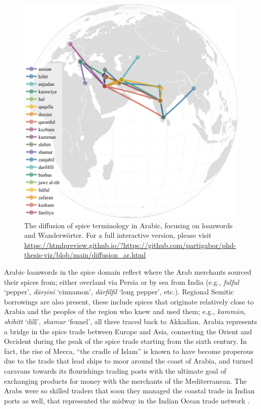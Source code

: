 \begin{figure}[ht!]
    \includegraphics[width=\linewidth]{imgs/plots/diffusion_ar.pdf}
    \caption[The diffusion of spice terminology in Arabic.]{The diffusion of spice terminology in Arabic, focusing on loanwords and Wanderwörter. For a full interactive version, please visit \url{https://htmlpreview.github.io/?https://github.com/partigabor/phd-thesis-viz/blob/main/diffusion_ar.html}}
    \label{fig:diffusion_ar}
\end{figure}

Arabic loanwords in the spice domain reflect where the Arab merchants sourced their spices from; either overland via Persia or by sea from India (e.g., \textit{fulful} `pepper', \textit{dārṣīnī} `cinnamon', \textit{dārfilfil} `long pepper', etc.). Regional Semitic borrowings are also present, these include spices that originate relatively close to Arabia and the peoples of the region who knew and used them; e.g., \textit{kammūn}, \textit{shibitt} `dill', \textit{shamar} `fennel', all three traced back to Akkadian. Arabia represents a bridge in the spice trade between Europe and Asia, connecting the Orient and Occident during the peak of the spice trade starting from the sixth century. In fact, the rise of Mecca, ``the cradle of Islam'' is known to have become properous due to the trade that lead ships to moor around the coast of Arabia, and turned caravans towards its flourishings trading posts with the ultimate goal of exchanging products for money with the merchants of the Mediterranean. The Arabs were so skilled traders that soon they managed the coastal trade in Indian ports as well, that represented the midway in the Indian Ocean trade network \autocite{parti_arab-indiai_2017}. 

